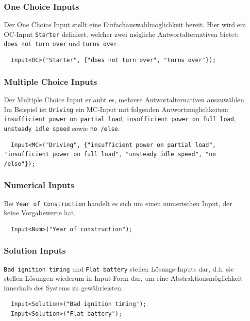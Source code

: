 \documentclass[a4paper,12pt]{report}
\begin{document}
  \subsubsection{One Choice Inputs}
  
  Der One Choice Input stellt eine Einfachauswahlmöglichkeit bereit. Hier wird ein OC-Input \texttt{Starter} definiert, welcher zwei mögliche Antwortalternativen bietet: \texttt{does not turn over} und \texttt{turns over}.
  
  \begin{lstlisting}
  Input<OC>("Starter", {"does not turn over", "turns over"});
  \end{lstlisting}
  
  \subsubsection{Multiple Choice Inputs}
  Der Multiple Choice Input erlaubt es, mehrere Antwortalternativen auszuwählen. Im Beispiel ist \texttt{Driving} ein MC-Input mit folgenden Antwortmöglichkeiten:
  \texttt{insufficient power on partial load}, \texttt{insufficient power on full load}, \texttt{unsteady idle speed} sowie \texttt{no /else}.
  
  \begin{lstlisting}
  Input<MC>("Driving", {"insufficient power on partial load", "insufficient power on full load", "unsteady idle speed", "no /else"});
  \end{lstlisting}

  \subsubsection{Numerical Inputs}
  
  Bei \texttt{Year of Construction} handelt es sich um einen numerischen Input, der keine Vorgabewerte hat.
  \begin{lstlisting}
  Input<Num>("Year of construction");
  \end{lstlisting}
  
  \subsubsection{Solution Inputs}
  \texttt{Bad ignition timing} und \texttt{Flat battery} stellen Lösungs-Inputs dar, d.h. sie stellen Lösungen wiederum in Input-Form dar, um eine Abstraktionsmöglichkeit
  innerhalb des Systems zu gewährleisten.
  
  \begin{lstlisting}  
  Input<Solution>("Bad ignition timing");
  Input<Solution>("Flat battery");
  \end{lstlisting}
  
\end{document}
